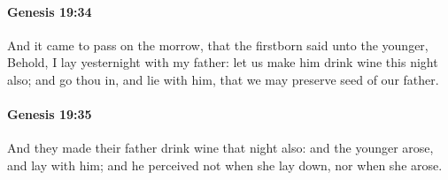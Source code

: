 		\paragraph{Genesis 19:34} %
			\label{GENESIS-19-34}

			And it came to pass on the morrow, that the firstborn said unto the younger, Behold, I lay yesternight with my father: let us make him drink wine this night also; and go thou in, and lie with him, that we may preserve seed of our father.


		\paragraph{Genesis 19:35} %
			\label{GENESIS-19-35}

			And they made their father drink wine that night also: and the younger arose, and lay with him; and he perceived not when she lay down, nor when she arose.

